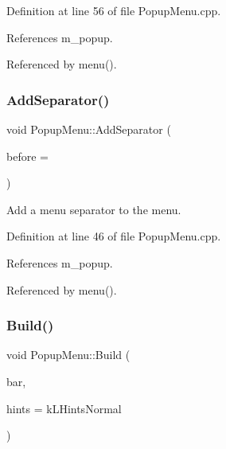 Definition at line 56 of file Popup\+Menu.\+cpp.



References m\+\_\+popup.



Referenced by menu().

\hypertarget{class_d_d4hep_1_1_popup_menu_a08a0c971bdb2b8783ea5bff019c64171}{}\label{class_d_d4hep_1_1_popup_menu_a08a0c971bdb2b8783ea5bff019c64171} 
\subsubsection{\texorpdfstring{Add\+Separator()}{AddSeparator()}}
{\footnotesize\ttfamily void Popup\+Menu\+::\+Add\+Separator (\begin{DoxyParamCaption}\item[{T\+G\+Menu\+Entry $\ast$}]{before = {} }\end{DoxyParamCaption})\hspace{0.3cm}{\ttfamily [virtual]}}



Add a menu separator to the menu. 



Definition at line 46 of file Popup\+Menu.\+cpp.



References m\+\_\+popup.



Referenced by menu().

\hypertarget{class_d_d4hep_1_1_popup_menu_a896a1626d79fd3d6ccb1c1e0657cf1ae}{}\label{class_d_d4hep_1_1_popup_menu_a896a1626d79fd3d6ccb1c1e0657cf1ae} 
\subsubsection{\texorpdfstring{Build()}{Build()}}
{\footnotesize\ttfamily void Popup\+Menu\+::\+Build (\begin{DoxyParamCaption}\item[{T\+G\+Menu\+Bar $\ast$}]{bar,  }\item[{int}]{hints = {\ttfamily kLHintsNormal} }\end{DoxyParamCaption})\hspace{0.3cm}{\ttfamily [virtual]}}



